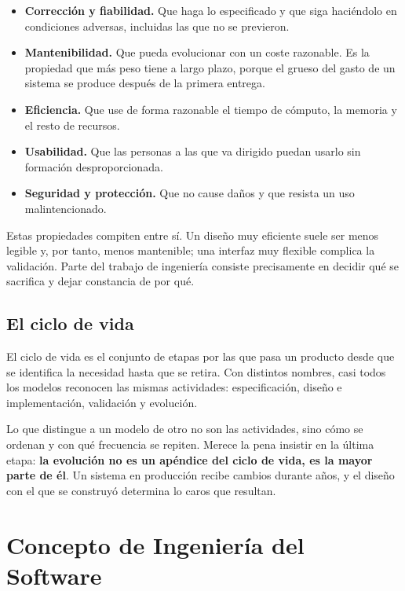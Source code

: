 \begin{itemize}
    \item \textbf{Corrección y fiabilidad.} Que haga lo especificado y que siga
          haciéndolo en condiciones adversas, incluidas las que no se previeron.
    \item \textbf{Mantenibilidad.} Que pueda evolucionar con un coste razonable.
          Es la propiedad que más peso tiene a largo plazo, porque el grueso del
          gasto de un sistema se produce después de la primera entrega.
    \item \textbf{Eficiencia.} Que use de forma razonable el tiempo de cómputo, la
          memoria y el resto de recursos.
    \item \textbf{Usabilidad.} Que las personas a las que va dirigido puedan
          usarlo sin formación desproporcionada.
    \item \textbf{Seguridad y protección.} Que no cause daños y que resista un uso
          malintencionado.
\end{itemize}

Estas propiedades compiten entre sí. Un diseño muy eficiente suele ser menos
legible y, por tanto, menos mantenible; una interfaz muy flexible complica la
validación. Parte del trabajo de ingeniería consiste precisamente en decidir qué
se sacrifica y dejar constancia de por qué.

\subsection*{El ciclo de vida}

El ciclo de vida es el conjunto de etapas por las que pasa un producto desde que
se identifica la necesidad hasta que se retira. Con distintos nombres, casi todos
los modelos reconocen las mismas actividades: especificación, diseño e
implementación, validación y evolución.

Lo que distingue a un modelo de otro no son las actividades, sino cómo se
ordenan y con qué frecuencia se repiten. Merece la pena insistir en la última
etapa: \textbf{la evolución no es un apéndice del ciclo de vida, es la mayor parte
de él}. Un sistema en producción recibe cambios durante años, y el diseño con el
que se construyó determina lo caros que resultan.

\section{Concepto de Ingeniería del Software}

